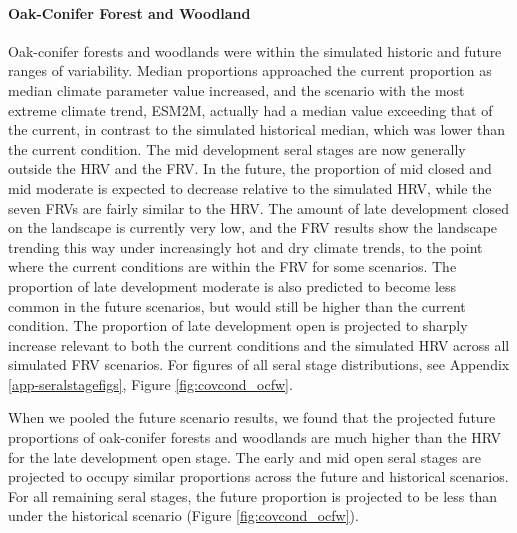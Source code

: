 \documentclass[12pt]{article}
\begin{document}
\begin{spacing}{1}
\paragraph{Oak-Conifer Forest and Woodland} Oak-conifer forests and woodlands were within the simulated historic and future ranges of variability. Median proportions approached the current proportion as median climate parameter value increased, and the scenario with the most extreme climate trend, ESM2M, actually had a median value exceeding that of the current, in contrast to the simulated historical median, which was lower than the current condition. The mid development seral stages are now generally outside the HRV and the FRV. In the future, the proportion of mid closed and mid moderate is expected to decrease relative to the simulated HRV, while the seven FRVs are fairly similar to the HRV. The amount of late development closed on the landscape is currently very low, and the FRV results show the landscape trending this way under increasingly hot and dry climate trends, to the point where the current conditions are within the FRV for some scenarios. The proportion of late development moderate is also predicted to become less common in the future scenarios, but would still be higher than the current condition. The proportion of late development open is projected to sharply increase relevant to both the current conditions and the simulated HRV across all simulated FRV scenarios. For figures of all seral stage distributions, see Appendix \ref{app-seralstagefigs}, Figure \ref{fig:covcond_ocfw}.

When we pooled the future scenario results, we found that the projected future proportions of oak-conifer forests and woodlands are much higher than the HRV for the late development open stage. The early and mid open seral stages are projected to occupy similar proportions across the future and historical scenarios. For all remaining seral stages, the future proportion is projected to be less than under the historical scenario (Figure \ref{fig:covcond_ocfw}).


\end{spacing}
\end{document}
